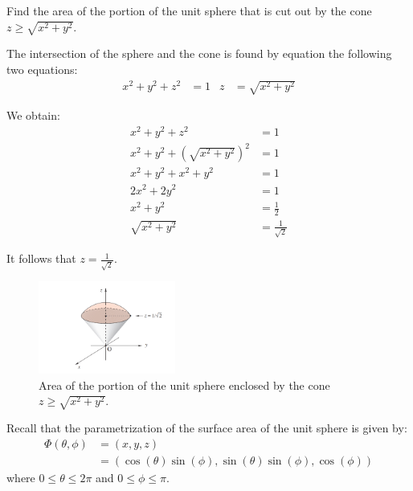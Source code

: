 \begin{tcolorbox}[
        title={Problem 10},
        valign=center,
        nobeforeafter,
        colframe=gray!95!black
    ]
    Find the area of the portion of the unit sphere that is cut out by the cone \(z \geq \sqrt{x^2 + y^2}\).
\end{tcolorbox}

\begin{solution}
    The intersection of the sphere and the cone is found by equation the following two equations:
    \begin{align*}
        x^2 + y^2 + z^2 &= 1 & z &= \sqrt{x^2 + y^2}
    \end{align*}
    
    We obtain:
    \begin{align*}
        x^2 + y^2 + z^2 &= 1 \\
        x^2 + y^2 + \left(\sqrt{x^2 + y^2}\right)^2 &= 1 \\
        x^2 + y^2 + x^2 + y^2 &= 1 \\
        2x^2 + 2y^2 &= 1 \\
        x^2 + y^2 &= \frac{1}{2} \\
        \sqrt{x^2 + y^2} &= \frac{1}{\sqrt{2}}
    \end{align*}
    
    It follows that \(z = \frac{1}{\sqrt{2}}\). 
    
    \begin{figure}[h!]
        \centering
        \includegraphics[width=0.4\textwidth]{Pictures/Tutorial 7-1.png}
        \caption{Area of the portion of the unit sphere enclosed by the cone \(z \geq \sqrt{x^2 + y^2}\).}
    \end{figure}
    
    Recall that the parametrization of the surface area of the unit sphere is given by:
    \begin{align}
        \Phi(\theta, \phi) &= (x, y, z) \\
        &= (\cos(\theta)\sin(\phi), \sin(\theta)\sin(\phi), \cos(\phi))
    \end{align}
    where \(0 \leq \theta \leq 2\pi\) and \(0 \leq \phi \leq \pi\).
    

\end{solution}
